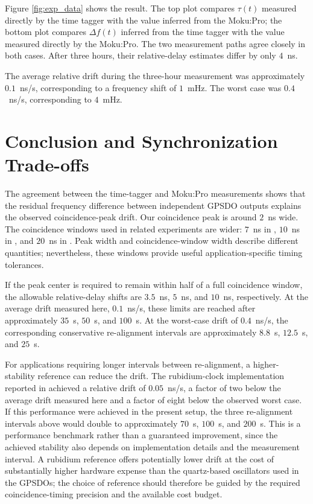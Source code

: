 \documentclass[a4paper,10pt]{article}
\begin{document}
Figure \ref{fig:exp_data} shows the result. The top plot compares $\tau(t)$ measured directly by the time tagger with the value inferred from the Moku:Pro; the bottom plot compares $\Delta f(t)$ inferred from the time tagger with the value measured directly by the Moku:Pro. The two measurement paths agree closely in both cases. After three hours, their relative-delay estimates differ by only $4$~ns.

The average relative drift during the three-hour measurement was approximately $0.1$~ns/s, corresponding to a frequency shift of $1$~mHz. The worst case was $0.4$~ns/s, corresponding to $4$~mHz.

\section{Conclusion and Synchronization Trade-offs}

The agreement between the time-tagger and Moku:Pro measurements shows that the residual frequency difference between independent GPSDO outputs explains the observed coincidence-peak drift. Our coincidence peak is around $2$~ns wide. The coincidence windows used in related experiments are wider: $7$~ns in \cite{Resch:05}, $10$~ns in \cite{seward1991daylight}, and $20$~ns in \cite{peng2005experimental}. Peak width and coincidence-window width describe different quantities; nevertheless, these windows provide useful application-specific timing tolerances.

If the peak center is required to remain within half of a full coincidence window, the allowable relative-delay shifts are $3.5$~ns, $5$~ns, and $10$~ns, respectively. At the average drift measured here, $0.1$~ns/s, these limits are reached after approximately $35$~s, $50$~s, and $100$~s. At the worst-case drift of $0.4$~ns/s, the corresponding conservative re-alignment intervals are approximately $8.8$~s, $12.5$~s, and $25$~s.

For applications requiring longer intervals between re-alignment, a higher-stability reference can reduce the drift. The rubidium-clock implementation reported in \cite{Resch:05} achieved a relative drift of $0.05$~ns/s, a factor of two below the average drift measured here and a factor of eight below the observed worst case. If this performance were achieved in the present setup, the three re-alignment intervals above would double to approximately $70$~s, $100$~s, and $200$~s. This is a performance benchmark rather than a guaranteed improvement, since the achieved stability also depends on implementation details and the measurement interval. A rubidium reference offers potentially lower drift at the cost of substantially higher hardware expense than the quartz-based oscillators used in the GPSDOs; the choice of reference should therefore be guided by the required coincidence-timing precision and the available cost budget.



\end{document}
